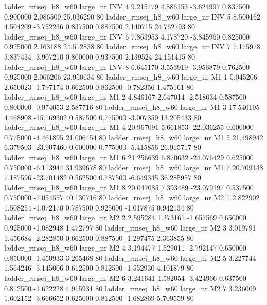ladder_rmsej_h8_w60   large_nr      INV                 4  9.215479  4.886153  -3.624997 0.837500 0.900000  2.086509   25.036290 80
ladder_rmsej_h8_w60   large_nr      INV                 5  8.500162  4.504209  -3.752236 0.837500 0.887500  2.140715   24.762793 80
ladder_rmsej_h8_w60   large_nr      INV                 6  7.863953  4.178720  -3.845960 0.825000 0.925000  2.163188   24.512838 80
ladder_rmsej_h8_w60   large_nr      INV                 7  7.175978  3.837434  -3.907210 0.800000 0.937500  2.139524   24.151415 80
ladder_rmsej_h8_w60   large_nr      INV                 8  6.645170  3.553919  -3.956879 0.762500 0.925000  2.066206   23.950634 80
ladder_rmsej_h8_w60   large_nr       M1                 1  5.045206  2.650023  -1.797174 0.662500 0.862500 -0.782356    1.475161 80
ladder_rmsej_h8_w60   large_nr       M1                 2  4.846167  2.647014  -2.518034 0.587500 0.800000 -0.974053    2.587716 80
ladder_rmsej_h8_w60   large_nr       M1                 3 17.540195  4.468908 -15.169302 0.587500 0.775000 -3.007359   13.205433 80
ladder_rmsej_h8_w60   large_nr       M1                 4 20.967091  5.661853 -22.036255 0.600000 0.775000 -4.461895   21.006454 80
ladder_rmsej_h8_w60   large_nr       M1                 5 21.498942  6.379503 -23.907460 0.600000 0.775000 -5.415856   26.915717 80
ladder_rmsej_h8_w60   large_nr       M1                 6 21.256639  6.870632 -24.076429 0.625000 0.750000 -6.113944   31.939678 80
ladder_rmsej_h8_w60   large_nr       M1                 7 20.709148  7.187596 -23.701482 0.562500 0.787500 -6.649345   36.285957 80
ladder_rmsej_h8_w60   large_nr       M1                 8 20.047085  7.393489 -23.079197 0.537500 0.750000 -7.054557   40.130716 80
ladder_rmsej_h8_w60   large_nr       M2                 1  2.822902  1.508254  -1.072170 0.787500 0.925000 -1.017875    0.942134 80
ladder_rmsej_h8_w60   large_nr       M2                 2  2.595284  1.373161  -1.657569 0.650000 0.925000 -1.082948    1.472797 80
ladder_rmsej_h8_w60   large_nr       M2                 3  3.019791  1.456684  -2.282850 0.662500 0.887500 -1.297475    2.363855 80
ladder_rmsej_h8_w60   large_nr       M2                 4  3.194477  1.529011  -2.792147 0.650000 0.850000 -1.450933    3.265468 80
ladder_rmsej_h8_w60   large_nr       M2                 5  3.227744  1.564246  -3.145006 0.612500 0.812500 -1.552930    4.101879 80
ladder_rmsej_h8_w60   large_nr       M2                 6  3.241641  1.582054  -3.424966 0.637500 0.812500 -1.622228    4.915931 80
ladder_rmsej_h8_w60   large_nr       M2                 7  3.236009  1.602152  -3.666652 0.625000 0.812500 -1.682869    5.709559 80
